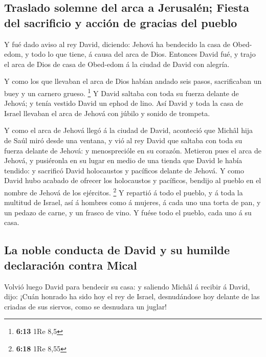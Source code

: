 \hypertarget{traslado-solemne-del-arca-a-jerusaluxe9n-fiesta-del-sacrificio-y-acciuxf3n-de-gracias-del-pueblo}{%
\subsection{Traslado solemne del arca a Jerusalén; Fiesta del sacrificio
y acción de gracias del
pueblo}\label{traslado-solemne-del-arca-a-jerusaluxe9n-fiesta-del-sacrificio-y-acciuxf3n-de-gracias-del-pueblo}}

 Y fué dado aviso al rey David, diciendo: Jehová ha
bendecido la casa de Obed-edom, y todo lo que tiene, á causa del arca de
Dios. Entonces David fué, y trajo el arca de Dios de casa de Obed-edom á
la ciudad de David con alegría.

 Y como los que llevaban el arca de Dios habían andado seis
pasos, sacrificaban un buey y un carnero grueso. \footnote{\textbf{6:13}
  1Re 8,5}  Y David saltaba con toda su fuerza delante de
Jehová; y tenía vestido David un ephod de lino.  Así David
y toda la casa de Israel llevaban el arca de Jehová con júbilo y sonido
de trompeta.

 Y como el arca de Jehová llegó á la ciudad de David,
aconteció que Michâl hija de Saúl miró desde una ventana, y vió al rey
David que saltaba con toda su fuerza delante de Jehová: y menosprecióle
en su corazón.  Metieron pues el arca de Jehová, y
pusiéronla en su lugar en medio de una tienda que David le había
tendido: y sacrificó David holocaustos y pacíficos delante de Jehová.
 Y como David hubo acabado de ofrecer los holocaustos y
pacíficos, bendijo al pueblo en el nombre de Jehová de los ejércitos.
\footnote{\textbf{6:18} 1Re 8,55}  Y repartió á todo el
pueblo, y á toda la multitud de Israel, así á hombres como á mujeres, á
cada uno una torta de pan, y un pedazo de carne, y un frasco de vino. Y
fuése todo el pueblo, cada uno á su casa.

\hypertarget{la-noble-conducta-de-david-y-su-humilde-declaraciuxf3n-contra-mical}{%
\subsection{La noble conducta de David y su humilde declaración contra
Mical}\label{la-noble-conducta-de-david-y-su-humilde-declaraciuxf3n-contra-mical}}

 Volvió luego David para bendecir su casa: y saliendo
Michâl á recibir á David, dijo: ¡Cuán honrado ha sido hoy el rey de
Israel, desnudándose hoy delante de las criadas de sus siervos, como se
desnudara un juglar!

